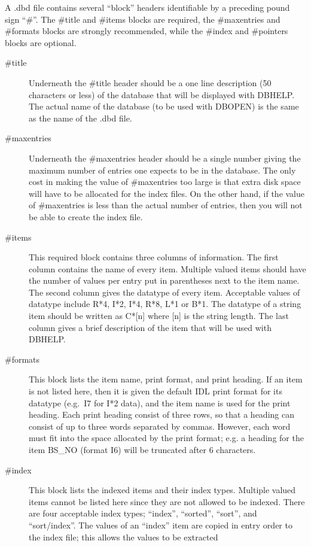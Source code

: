 A .dbd file contains several ``block'' headers identifiable by a 
preceding pound sign ``\#''.  The \#title and \#items blocks are
required, the \#maxentries and \#formats blocks are strongly recommended,
while the \#index and \#pointers blocks are optional.
\begin{description}
\item [\#title] Underneath the \#title header should be a one line description
(50 characters or less) of the database that will be displayed with
DBHELP.  The actual name of the database (to be used with DBOPEN) is the
same as the name of the .dbd file.   
\item [\#maxentries] Underneath the \#maxentries header should be a single
number giving the maximum number of entries one expects to be in the database.
The only cost in making the value of \#maxentries too large is that extra
disk space will have to be allocated for the index files.   On the other
hand, if the value of \#maxentries is less than the actual number of entries,   
then you will not be able to create the index file.
\item [\#items]  This required block contains three columns of information.
The first column contains the name of every item.  Multiple valued items
should have the number of values per entry put in parentheses next to the
item name.
The second column
gives the datatype of every item.  Acceptable values of datatype include
R*4, I*2, I*4, R*8, L*1 or B*1.   The datatype of a string item should be
written as C*[n] where [n] is the string length.  The last column
gives a brief description of the item that will be used with DBHELP.
\item [\#formats] This block lists the item name, print format, and print
heading.  If an item is not listed here, then it is given the default
IDL print format for its datatype (e.g.\ I7 for I*2 data), and the item
name is used for the print heading.  Each print heading consist of three
rows, so that a heading can consist of up to three words separated by
commas.   However, each word must fit into the space allocated by the
print format; e.g. a heading for the item BS\_NO (format I6) will be
truncated after 6 characters.
\item [\#index]  
This block lists the indexed items and their index types.  Multiple
valued items cannot be listed here since they are not allowed to be 
indexed.
There are four acceptable index types; ``index'', ``sorted'',
``sort'', and ``sort/index''.   
The values of an ``index'' item are copied in 
entry order to the index file; this allows the values to be extracted

\end{description}
